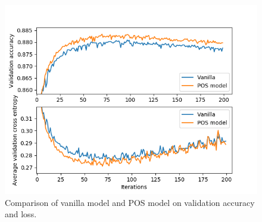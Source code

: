 \documentclass[conference]{IEEEtran}
\begin{document}
\begin{figure}
\centering
\includegraphics[scale=0.6]{fig/Acc_pos_vs_vanilla.png}
\caption{Comparison of vanilla model and POS model on validation accuracy and loss.}
\label{fig:val_comp}
\end{figure}
    
\end{document}
